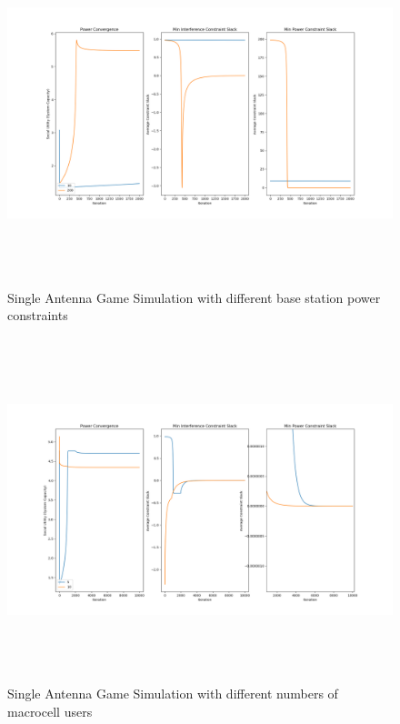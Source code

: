 \documentclass[12pt,a4paper]{report}
\begin{document}
\begin{figure}[H]
	\includegraphics[width= 15cm,height = 10cm]{figures/single_power}
	  \caption{Single Antenna Game Simulation with different base station power constraints}
\end{figure}

\begin{figure}[H]
	\includegraphics[width= 15cm,height = 10cm]{figures/single_macro}
	  \caption{Single Antenna Game Simulation with different numbers of macrocell users}
\end{figure}
\end{document}
